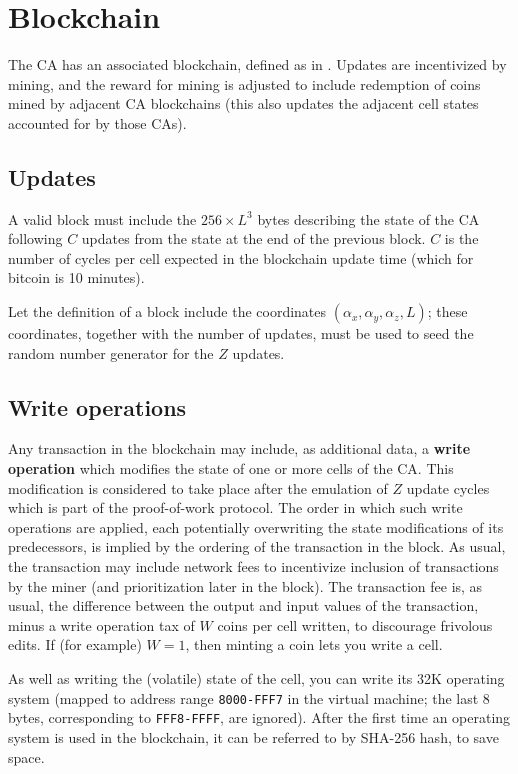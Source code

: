 \documentclass{article}
\newcommand\hex[1]{{\tt #1}}
\newcommand\hexrange[2]{\hex{#1}{\tt -}\hex{#2}}
\begin{document}
\section{Blockchain}
\label{sec:Blockchain}

The CA has an associated blockchain, defined as in \cite{Nakamoto2008}.
Updates are incentivized by mining,
and the reward for mining is adjusted to include redemption of coins mined by adjacent CA blockchains
(this also updates the adjacent cell states accounted for by those CAs).

\subsection{Updates}

A valid block must include the $256 \times L^3$ bytes describing the state of the CA following $C$ updates
from the state at the end of the previous block.
$C$ is the number of cycles per cell expected in the blockchain update time
(which for bitcoin is 10 minutes).

Let the definition of a block include the coordinates $(\alpha_x,\alpha_y,\alpha_z,L)$;
these coordinates, together with the number of updates,
must be used to seed the random number generator for the $Z$ updates.

\subsection{Write operations}

Any transaction in the blockchain may include, as additional data,
a {\bf write operation} which modifies the state of one or more cells of the CA.
This modification is considered to take place after the emulation of $Z$ update cycles
which is part of the proof-of-work protocol.
The order in which such write operations are applied,
each potentially overwriting the state modifications of its predecessors,
is implied by the ordering of the transaction in the block.
As usual, the transaction may include network fees to incentivize inclusion of transactions
by the miner
(and prioritization later in the block).
The transaction fee is, as usual, the difference between the output and input values of the transaction,
minus a write operation tax of $W$ coins per cell written,
to discourage frivolous edits.
If (for example) $W=1$, then minting a coin lets you write a cell.

As well as writing the (volatile) state of the cell, you can write its 32K operating system
(mapped to address range \hexrange{8000}{FFF7} in the virtual machine; the last 8 bytes, corresponding to \hexrange{FFF8}{FFFF}, are ignored).
After the first time an operating system is used in the blockchain, it can be referred to by SHA-256 hash, to save space.
\end{document}
